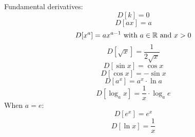 \documentclass{article}
\begin{document}
Fundamental derivatives:
\begin{equation}
D [k] = 0
\end{equation}
\begin{equation}
D [ax] = a
\end{equation}
\begin{equation}
D [x^a] = ax^{a-1} \textnormal{ with } a \in \mathbb{R} \textnormal{ and } x > 0
\end{equation}
\begin{equation}
D [\sqrt{x}] = \frac{1}{2\sqrt{x}}
\end{equation}
\begin{equation}
D [\sin{x}] = \cos{x}
\end{equation}
\begin{equation}
D [\cos{x}] = -\sin{x}
\end{equation}
\begin{equation}
D [a^x] = a^x\cdot\ln{a}
\end{equation}
\begin{equation}
D [\log_a{x}] = \frac{1}{x}\cdot\log_a{e}
\end{equation}
When $a = e$:
\begin{equation}
D [e^x] = e^x
\end{equation}
\begin{equation}
D [\ln{x}] = \frac{1}{x}
\end{equation}
\end{document}
